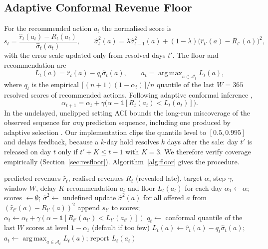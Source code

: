 \documentclass{ieeeaccess}
\DeclareMathOperator*{\argmax}{arg\,max}
\begin{document}
\subsection{Adaptive Conformal Revenue Floor}
\label{sec:floor}
For the recommended action $a_t$ the normalised score is
\begin{equation}
s_t=\frac{\hat r_t(a_t)-R_t(a_t)}{\hat\sigma_t(a_t)},\qquad \hat\sigma^2_{t}(a)=\lambda\hat\sigma^2_{t-1}(a)+(1-\lambda)\bigl(\hat r_{t'}(a)-R_{t'}(a)\bigr)^2,
\end{equation}
with the error scale updated only from resolved days $t'$. The floor and recommendation are
\begin{equation}
L_t(a)=\hat r_t(a)-q_t\hat\sigma_t(a),\qquad a_t=\argmax_{a\in\mathcal A_t}L_t(a),
\label{eq:floor}
\end{equation}
where $q_t$ is the empirical $\lceil(n+1)(1-\alpha_t)\rceil/n$ quantile of the last $W=365$ resolved scores of recommended actions. Following adaptive conformal inference \cite{gibbs2021},
\begin{equation}
\alpha_{t+1}=\alpha_t+\gamma\bigl(\alpha-\mathbb 1[R_t(a_t)<L_t(a_t)]\bigr).
\end{equation}
In the undelayed, unclipped setting ACI bounds the long-run miscoverage of the observed sequence for \emph{any} prediction sequence, including one produced by adaptive selection \cite{gibbs2021}. Our implementation clips the quantile level to $[0.5,0.995]$ and delays feedback, because a $k$-day hold resolves $k$ days after the sale: day $t'$ is released on day $t$ only if $t'+K\le t-1$ with $K=3$. We therefore verify coverage empirically (Section~\ref{sec:resfloor}). Algorithm~\ref{alg:floor} gives the procedure.

\begin{algorithm}[!t]
\caption{Online Conformal Floor With Delayed Feedback (one farmer origin)}
\label{alg:floor}
\begin{algorithmic}[1]
\REQUIRE predicted revenues $\hat r_t$, realised revenues $R_t$ (revealed late), target $\alpha$, step $\gamma$, window $W$, delay $K$
\ENSURE recommendation $a_t$ and floor $L_t(a_t)$ for each day
\STATE $\alpha_1\leftarrow\alpha$; scores $\leftarrow\emptyset$; $\hat\sigma^2\leftarrow$ undefined
\STATE update $\hat\sigma^2(a)$ for all offered $a$ from $(\hat r_{t'}(a)-R_{t'}(a))^2$
\STATE append $s_{t'}$ to scores; $\alpha_t\leftarrow\alpha_t+\gamma(\alpha-\mathbb 1[R_{t'}(a_{t'})<L_{t'}(a_{t'})])$
\ENDFOR
\STATE $q_t\leftarrow$ conformal quantile of the last $W$ scores at level $1-\alpha_t$ (default if too few)
\STATE $L_t(a)\leftarrow\hat r_t(a)-q_t\hat\sigma_t(a)$; $a_t\leftarrow\argmax_{a\in\mathcal A_t}L_t(a)$; report $L_t(a_t)$
\ENDFOR
\end{algorithmic}
\end{algorithm}
\end{document}
